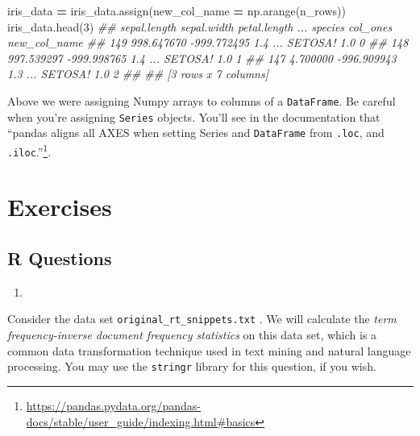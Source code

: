 \documentclass[
  12pt,
  krantz2]{krantz}
\makeatletter
\newenvironment{Shaded}{\begin{snugshade}}{\end{snugshade}}
\newcommand{\CommentTok}[1]{\textcolor[rgb]{0.37,0.37,0.37}{\textit{#1}}}
\newcommand{\DecValTok}[1]{\textcolor[rgb]{0.06,0.06,0.06}{#1}}
\newcommand{\NormalTok}[1]{#1}
\newcommand{\OperatorTok}[1]{\textcolor[rgb]{0.43,0.43,0.43}{\textbf{#1}}}
\providecommand{\tightlist}{%
  \setlength{\itemsep}{0pt}\setlength{\parskip}{0pt}}
\renewcommand{\href}[2]{#2\footnote{\url{#1}}}
\newenvironment{kframe}{%
\medskip{}
\setlength{\fboxsep}{.8em}
 \def\at@end@of@kframe{}%
 \ifinner\ifhmode%
  \def\at@end@of@kframe{\end{minipage}}%
  \begin{minipage}{\columnwidth}%
 \fi\fi%
 \def\FrameCommand##1{\hskip\@totalleftmargin \hskip-\fboxsep
 \colorbox{shadecolor}{##1}\hskip-\fboxsep
     \hskip-\linewidth \hskip-\@totalleftmargin \hskip\columnwidth}%
 \MakeFramed {\advance\hsize-\width
   \@totalleftmargin\z@ \linewidth\hsize
   \@setminipage}}%
 {\par\unskip\endMakeFramed%
 \at@end@of@kframe}
\renewenvironment{Shaded}{\begin{kframe}}{\end{kframe}}
\makeatother
\begin{document}
\begin{Shaded}
\begin{Highlighting}[]
\NormalTok{iris\_data }\OperatorTok{=}\NormalTok{ iris\_data.assign(new\_col\_name }\OperatorTok{=}\NormalTok{ np.arange(n\_rows))}
\NormalTok{iris\_data.head(}\DecValTok{3}\NormalTok{)}
\CommentTok{\#\#      sepal.length  sepal.width  petal.length  ...  species col\_ones  new\_col\_name}
\CommentTok{\#\# 149    998.647670  {-}999.772495           1.4  ...  SETOSA!      1.0             0}
\CommentTok{\#\# 148    997.539297  {-}999.998765           1.4  ...  SETOSA!      1.0             1}
\CommentTok{\#\# 147      4.700000  {-}996.909943           1.3  ...  SETOSA!      1.0             2}
\CommentTok{\#\# }
\CommentTok{\#\# [3 rows x 7 columns]}
\end{Highlighting}
\end{Shaded}

Above we were assigning Numpy arrays to columns of a \texttt{DataFrame}. Be careful when you're assigning \texttt{Series} objects. You'll see in the documentation that \href{https://pandas.pydata.org/pandas-docs/stable/user_guide/indexing.html\#basics}{``pandas aligns all AXES when setting Series and \texttt{DataFrame} from \texttt{.loc}, and \texttt{.iloc}.''}.

\hypertarget{exercises-6}{%
\section{Exercises}\label{exercises-6}}

\hypertarget{r-questions-6}{%
\subsection{R Questions}\label{r-questions-6}}

\begin{enumerate}
\def\labelenumi{\arabic{enumi}.}
\tightlist
\item
\end{enumerate}

Consider the data set \texttt{original\_rt\_snippets.txt} \citep{SocherEtAl2013:RNTN}. We will calculate the \emph{term frequency-inverse document frequency statistics} \citep{Jones72astatistical} on this data set, which is a common data transformation technique used in text mining and natural language processing. You may use the \texttt{stringr} library for this question, if you wish.
\end{document}
